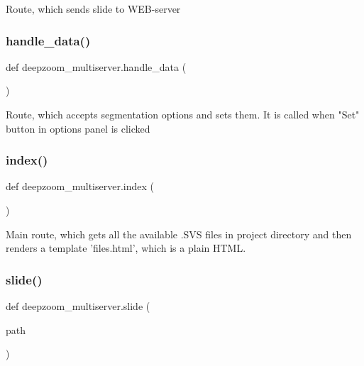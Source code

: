 \begin{DoxyVerb}Route, which sends slide to WEB-server
\end{DoxyVerb}
 \mbox{\label{namespacedeepzoom__multiserver_ae5aeab5ad3eb3d8df05ef0ecbce34f93}} 
\subsubsection{\texorpdfstring{handle\+\_\+data()}{handle\_data()}}
{\footnotesize\ttfamily def deepzoom\+\_\+multiserver.\+handle\+\_\+data (\begin{DoxyParamCaption}{ }\end{DoxyParamCaption})}

\begin{DoxyVerb}Route, which accepts segmentation options and sets them.
It is called when "Set" button in options panel is clicked
\end{DoxyVerb}
 \mbox{\label{namespacedeepzoom__multiserver_a9b00bda79f7bb2c81831f90df5b7fbd3}} 
\subsubsection{\texorpdfstring{index()}{index()}}
{\footnotesize\ttfamily def deepzoom\+\_\+multiserver.\+index (\begin{DoxyParamCaption}{ }\end{DoxyParamCaption})}

\begin{DoxyVerb}Main route, which gets all the available .SVS files in project directory
and then renders a template 'files.html', which is a plain HTML.
\end{DoxyVerb}
 \mbox{\label{namespacedeepzoom__multiserver_a4d8664b2e2f006c8eaee41b95ff9ac32}} 
\subsubsection{\texorpdfstring{slide()}{slide()}}
{\footnotesize\ttfamily def deepzoom\+\_\+multiserver.\+slide (\begin{DoxyParamCaption}\item[{}]{path }\end{DoxyParamCaption})}

